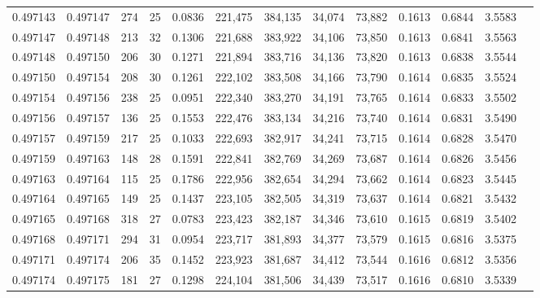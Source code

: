 \begin{tabular}{rrrrrrrrrrrrr}
0.497143 & 0.497147 & 274 &  25 &                                     0.0836 & 221,475 & 384,135 &  34,074 &  73,882 & 0.1613 & 0.6844 & 3.5583 \\
0.497147 & 0.497148 & 213 &  32 &                                     0.1306 & 221,688 & 383,922 &  34,106 &  73,850 & 0.1613 & 0.6841 & 3.5563 \\
0.497148 & 0.497150 & 206 &  30 &                                     0.1271 & 221,894 & 383,716 &  34,136 &  73,820 & 0.1613 & 0.6838 & 3.5544 \\
0.497150 & 0.497154 & 208 &  30 &                                     0.1261 & 222,102 & 383,508 &  34,166 &  73,790 & 0.1614 & 0.6835 & 3.5524 \\
0.497154 & 0.497156 & 238 &  25 &                                     0.0951 & 222,340 & 383,270 &  34,191 &  73,765 & 0.1614 & 0.6833 & 3.5502 \\
0.497156 & 0.497157 & 136 &  25 &                                     0.1553 & 222,476 & 383,134 &  34,216 &  73,740 & 0.1614 & 0.6831 & 3.5490 \\
0.497157 & 0.497159 & 217 &  25 &                                     0.1033 & 222,693 & 382,917 &  34,241 &  73,715 & 0.1614 & 0.6828 & 3.5470 \\
0.497159 & 0.497163 & 148 &  28 &                                     0.1591 & 222,841 & 382,769 &  34,269 &  73,687 & 0.1614 & 0.6826 & 3.5456 \\
0.497163 & 0.497164 & 115 &  25 &                                     0.1786 & 222,956 & 382,654 &  34,294 &  73,662 & 0.1614 & 0.6823 & 3.5445 \\
0.497164 & 0.497165 & 149 &  25 &                                     0.1437 & 223,105 & 382,505 &  34,319 &  73,637 & 0.1614 & 0.6821 & 3.5432 \\
0.497165 & 0.497168 & 318 &  27 &                                     0.0783 & 223,423 & 382,187 &  34,346 &  73,610 & 0.1615 & 0.6819 & 3.5402 \\
0.497168 & 0.497171 & 294 &  31 &                                     0.0954 & 223,717 & 381,893 &  34,377 &  73,579 & 0.1615 & 0.6816 & 3.5375 \\
0.497171 & 0.497174 & 206 &  35 &                                     0.1452 & 223,923 & 381,687 &  34,412 &  73,544 & 0.1616 & 0.6812 & 3.5356 \\
0.497174 & 0.497175 & 181 &  27 &                                     0.1298 & 224,104 & 381,506 &  34,439 &  73,517 & 0.1616 & 0.6810 & 3.5339 \\

\end{tabular}
